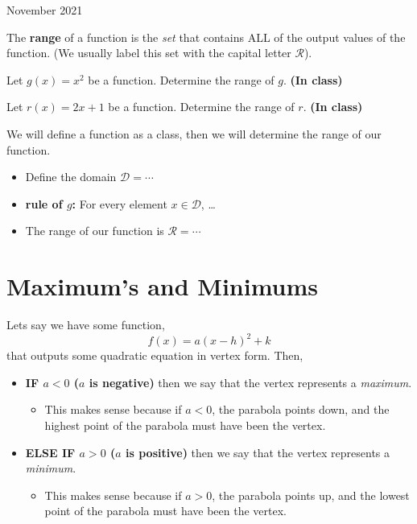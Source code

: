 \documentclass[12pt,oneside]{book} %
\begin{document}
\begin{lec}{November 2021}
  \begin{mdframed}
    \begin{defn}
      The \textbf{range} of a function is the \emph{set} that contains ALL of the output values of the function. (We usually label
      this set with the capital letter $\mathcal{R}$).
    \end{defn}
  \end{mdframed}
  \begin{ex}
    Let $g(x) = x^2$ be a function. Determine the range of $g$. \textbf{(In class)}
  \end{ex}
  \begin{ex}
    Let $r(x) = 2x + 1$ be a function. Determine the range of $r$. \textbf{(In class)}
  \end{ex}

  \begin{ex}
    We will define a function as a class, then we will determine the range of our function.
    \begin{itemize}
      \item Define the domain $\mathcal{D} = \cdots$ 
      \item \textbf{rule of $g$:} For every element $x\in \mathcal{D}$, \ldots 
      \item The range of our function is $\mathcal{R} = \cdots$
    \end{itemize}
  \end{ex}

 \section{Maximum's and Minimums}
 Lets say we have some function,
    \[
          f(x) = a(x - h) ^2 + k
    \] 
 that outputs some quadratic equation in vertex form. Then,
  \begin{itemize}
		\item \textbf{IF $a < 0$ ($a$ is negative)} then we say that the vertex represents a \emph{maximum}.
			\begin{itemize}
				\item This makes sense because if $a < 0$, the parabola points down, and the highest point of the parabola must have been
					the vertex.
			\end{itemize}
		\item \textbf{ELSE IF $a > 0$ ($a$ is positive)} then we say that the vertex represents a \emph{minimum}.
			\begin{itemize}
				\item This makes sense because if $a > 0$, the parabola points up, and the lowest point of the parabola must have been
					the vertex.
			\end{itemize}
\end{itemize}






	









	\end{lec}
\end{document}
